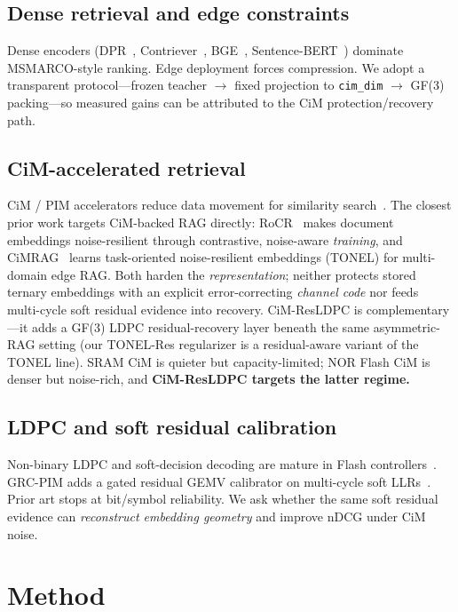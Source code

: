 \documentclass[sigconf,review,anonymous]{acmart}
\begin{document}
\subsection{Dense retrieval and edge constraints}
Dense encoders (DPR~\cite{karpukhin2020dpr}, Contriever~\cite{izacard2022contriever}, BGE~\cite{xiao2023bge}, Sentence-BERT~\cite{reimers2019sentencebert}) dominate MSMARCO-style ranking.
Edge deployment forces compression.
We adopt a transparent protocol---frozen teacher $\rightarrow$ fixed projection to \texttt{cim\_dim} $\rightarrow$ GF(3) packing---so measured gains can be attributed to the CiM protection/recovery path.

\subsection{CiM-accelerated retrieval}
CiM / PIM accelerators reduce data movement for similarity search~\cite{sebastian2017pcm,shafiee2016isaac}.
The closest prior work targets CiM-backed RAG directly: RoCR~\cite{qin2024rocr} makes document embeddings noise-resilient through contrastive, noise-aware \emph{training}, and CiMRAG~\cite{chiu2026cimrag} learns task-oriented noise-resilient embeddings (TONEL) for multi-domain edge RAG.
Both harden the \emph{representation}; neither protects stored ternary embeddings with an explicit error-correcting \emph{channel code} nor feeds multi-cycle soft residual evidence into recovery.
CiM-ResLDPC is complementary---it adds a GF(3) LDPC residual-recovery layer beneath the same asymmetric-RAG setting (our TONEL-Res regularizer is a residual-aware variant of the TONEL line).
SRAM CiM is quieter but capacity-limited; NOR Flash CiM is denser but noise-rich, and \textbf{CiM-ResLDPC targets the latter regime.}

\subsection{LDPC and soft residual calibration}
Non-binary LDPC and soft-decision decoding are mature in Flash controllers~\cite{gallager1962ldpc,davey1998nbldpc}.
GRC-PIM adds a gated residual GEMV calibrator on multi-cycle soft LLRs~\cite{grcpim2025}.
Prior art stops at bit/symbol reliability.
We ask whether the same soft residual evidence can \emph{reconstruct embedding geometry} and improve nDCG under CiM noise.

\section{Method}
\end{document}
